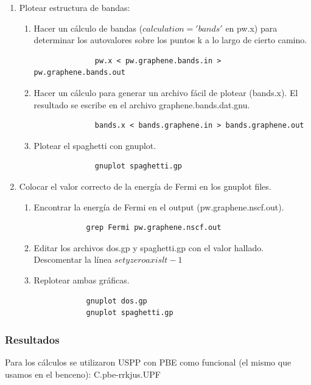 \begin{enumerate}
      \item Plotear estructura de bandas:
        \begin{enumerate}
          \item Hacer un cálculo de bandas ($calculation = 'bands'$ en pw.x) para determinar los autovalores sobre los puntos k a lo largo de cierto camino.
            \begin{verbatim}
              pw.x < pw.graphene.bands.in > pw.graphene.bands.out
            \end{verbatim}
          \item Hacer un cálculo para generar un archivo fácil de plotear (bands.x). El resultado se escribe en el archivo graphene.bands.dat.gnu.
            \begin{verbatim}
              bands.x < bands.graphene.in > bands.graphene.out
            \end{verbatim}
          \item Plotear el spaghetti con gnuplot.
            \begin{verbatim}
              gnuplot spaghetti.gp
            \end{verbatim}
        \end{enumerate}
      \item Colocar el valor correcto de la energía de Fermi en los gnuplot files.
        \begin{enumerate}
          \item Encontrar la energía de Fermi en el output (pw.graphene.nscf.out).
          \begin{verbatim}
            grep Fermi pw.graphene.nscf.out
          \end{verbatim}
          \item Editar los archivos dos.gp y spaghetti.gp con el valor hallado. Descomentar la línea $set yzeroaxis lt -1$
          \item Replotear ambas gráficas.
          \begin{verbatim}
            gnuplot dos.gp
            gnuplot spaghetti.gp
          \end{verbatim}
        \end{enumerate}
    \end{enumerate}

\subsubsection{Resultados}

  Para los cálculos se utilizaron USPP con PBE como funcional (el mismo que usamos en el benceno): C.pbe-rrkjus.UPF



